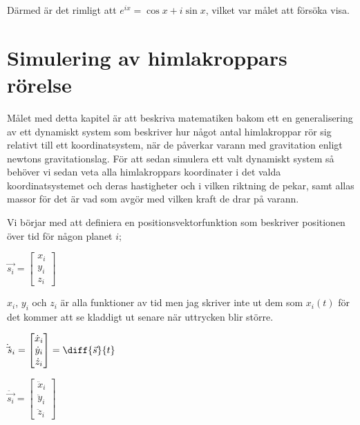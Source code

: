 \documentclass[10pt, a4paper]{amsart}
\begin{document}
Därmed är det rimligt att $ e^{ix} = \cos x + i\sin x $, vilket var målet att försöka visa.

\newpage
\section{Simulering av himlakroppars rörelse}

Målet med detta kapitel är att beskriva matematiken bakom ett en generalisering av ett dynamiskt system som beskriver hur något antal himlakroppar rör sig relativt till ett koordinatsystem, 
när de påverkar varann med gravitation enligt newtons gravitationslag. För att sedan simulera ett valt dynamiskt system så behöver vi sedan veta alla himlakroppars koordinater i det valda koordinatsystemet och deras hastigheter och i vilken riktning de pekar, 
samt allas massor för det är vad som avgör med vilken kraft de drar på varann.
\bigskip

Vi börjar med att definiera en positionsvektorfunktion som beskriver positionen över tid för någon planet $ i $;
\bigskip

\bigskip
\hspace{5ex}
$ \vec{s_i} = 
    \begin{bmatrix}
    x_i \\
    y_i \\
    z_i 
    \end{bmatrix} $
\bigskip
\bigskip

$ x_i $, $ y_i $ och $ z_i $ är alla funktioner av tid men jag skriver inte ut dem som $ x_i(t) $ för det kommer att se kladdigt ut senare när uttrycken blir större. 
\bigskip

\bigskip
\hspace{5ex}
$ \dot \vec{s_i} = 
    \begin{bmatrix}
    \dot x_i \\
    \dot y_i \\
    \dot z_i 
    \end{bmatrix} = \diff{\vec{s}}{t} $

\bigskip
\hspace{5ex}
$ \ddot \vec{s_i} = 
    \begin{bmatrix}
    \ddot x_i \\
    \ddot y_i \\
    \ddot z_i 
    \end{bmatrix} $
\bigskip
\bigskip
\end{document}
